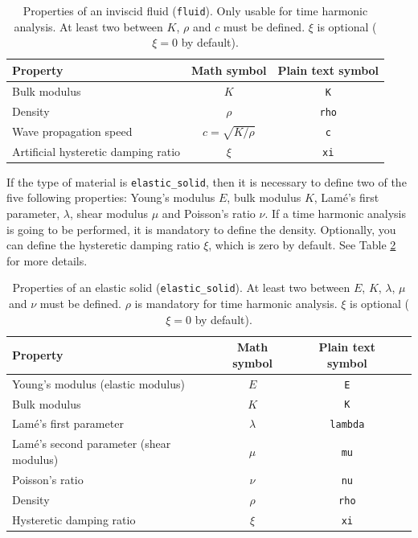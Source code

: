 \documentclass[a4paper,fleqn]{book}
\begin{document}
\begin{table}[h]
\centering
{\small
\begin{tabular}{lcc}
\textbf{Property} & \textbf{Math symbol} & \textbf{Plain text symbol} \\
\midrule
Bulk modulus             & $K$                & \texttt{K}   \\
Density                  & $\rho$             & \texttt{rho} \\
Wave propagation speed   & $c=\sqrt{K/\rho}$  & \texttt{c}   \\ 
Artificial hysteretic damping ratio  & $\xi$  & \texttt{xi} 
\end{tabular}
}
\caption{Properties of an inviscid fluid (\texttt{fluid}). Only usable for time harmonic analysis. At least two between $K$, $\rho$ and $c$ must be defined. $\xi$ is optional ($\xi=0$ by default).}
\label{tab:fluid}
\end{table}

If the type of material is \texttt{elastic\_solid}, then it is necessary to define two of the five following properties: Young's modulus $E$, bulk modulus $K$, Lam\'e's first parameter, $\lambda$, shear modulus $\mu$ and Poisson's ratio $\nu$. If a time harmonic analysis is going to be performed, it is mandatory to define the density. Optionally, you can define the hysteretic damping ratio $\xi$, which is zero by default. See Table \ref{tab:elastic} for more details.

\begin{table}[h]
\centering
{\small
\begin{tabular}{lccl}
\textbf{Property} & \textbf{Math symbol} & \textbf{Plain text symbol} \\
\midrule
Young's modulus (elastic modulus)         & $E$       & \texttt{E}      \\
Bulk modulus                              & $K$       & \texttt{K}      \\
Lam\'e's first parameter                  & $\lambda$ & \texttt{lambda} \\
Lam\'e's second parameter (shear modulus) & $\mu$     & \texttt{mu}     \\
Poisson's ratio                           & $\nu$     & \texttt{nu}     \\
Density                                   & $\rho$    & \texttt{rho}    \\
Hysteretic damping ratio                  & $\xi$     & \texttt{xi}     
\end{tabular}
}
\caption{Properties of an elastic solid (\texttt{elastic\_solid}). At least two between $E$, $K$, $\lambda$, $\mu$ and $\nu$ must be defined. $\rho$ is mandatory for time harmonic analysis. $\xi$ is optional ($\xi=0$ by default).}
\label{tab:elastic}
\end{table}
\end{document}

